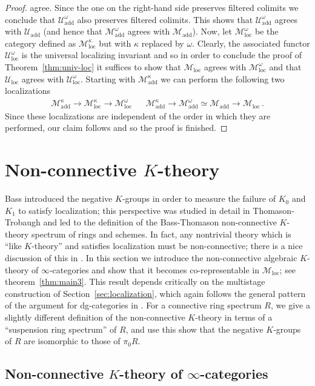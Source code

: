 \documentclass{amsart}
\newcommand{\cM}{{\mathcal M}}
\newcommand{\cU}{{\mathcal U}}
\newcommand{\too}{\longrightarrow}%
\renewcommand{\i}{\infty}
\newcommand{\Motadd}{\cM_{\mathrm{add}}}
\newcommand{\Motloc}{\cM_\mathrm{loc}}
\newcommand{\Uloc}{\cU_{\mathrm{loc}}}
\newcommand{\Uadd}{\cU_{\mathrm{add}}}
\numberwithin{equation}{section}
\theoremstyle{definition}
\begin{document}
\begin{proof}
agree. Since the one on the right-hand side preserves filtered
colimits we conclude that $\Uadd^\omega$ also preserves filtered
colimits. This shows that $\Uadd^\omega$ agrees with $\Uadd$ (and
hence that $\Motadd^\omega$ agrees with $\Motadd$).  Now, let
$\Motloc^\omega$ be the category defined as $\Motloc^\kappa$ but 
with $\kappa$ replaced by $\omega$. Clearly, the associated functor
$\Uloc^\omega$ is the universal localizing invariant and so in order
to conclude the proof of Theorem~\ref{thm:univ-loc} it suffices to
show that $\Motloc$ agrees with $\Motloc^\omega$ and that $\Uloc$
agrees with $\Uloc^\omega$. Starting with $\Motadd^\kappa$ we can
perform the following two localizations  
\begin{eqnarray*}
\Motadd^\kappa \too \Motloc^\kappa \too \Motloc^\omega
&& \Motadd^\kappa \too \Motadd^\omega \simeq \Motadd \too \Motloc\,. 
\end{eqnarray*}
Since these localizations are independent of the order in which they
are performed, our claim follows and so the proof is finished.
\end{proof}

\section{Non-connective $K$-theory}\label{sec:non-connective}

Bass introduced the negative $K$-groups in order to measure the
failure of $K_0$ and $K_1$ to satisfy localization; this
perspective was studied in detail in Thomason-Trobaugh and led to the
definition of the Bass-Thomason non-connective $K$-theory spectrum of
rings and schemes.  In fact, any nontrivial theory which is ``like $K$-theory'' and 
satisfies localization must be non-connective; there is a nice
discussion of this in \cite{keller}.
In this section we introduce the non-connective algebraic $K$-theory of $\i$-categories
and show that it becomes co-representable in $\Motloc$; see
theorem~\ref{thm:main3}. This result depends critically on the multistage construction of Section~\ref{sec:localization}, which again follows the general pattern of the argument for dg-categories in \cite{CisTab}. For a connective ring spectrum $R$, we give a slightly different definition of the non-connective $K$-theory in terms of a ``suspension ring spectrum'' of $R$, and use this show that the negative $K$-groups of $R$ are isomorphic to those of $\pi_0 R$. 

\subsection{Non-connective $K$-theory of
$\i$-categories}\label{sub:non-conn}
\end{document}
